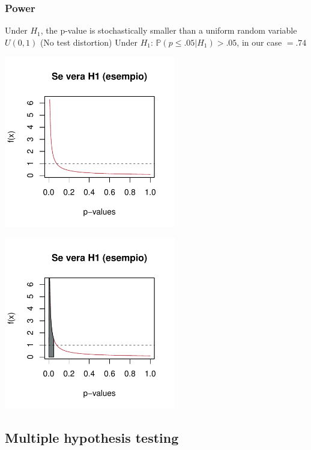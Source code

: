 \documentclass[xcolor={dvipsnames}]{beamer}
\begin{document}
\begin{frame}
\frametitle{Power}


\begin{overprint}
 {Under $H_1$, the p-value is stochastically smaller than a uniform random variable $U(0,1)$ (No test distortion)}
 {Under $H_1$: $\mathbb{P}(p\leq .05 |H_1)>.05$, in our case $= .74$\\ }
\end{overprint}
\begin{overprint} 
 \centerline{\includegraphics[width=7.5cm]{plaatjes/beta1}}
 \centerline{\includegraphics[width=7.5cm]{plaatjes/beta2}}
\end{overprint} 
\end{frame}

\subsection{Multiple hypothesis testing}
\end{document}
